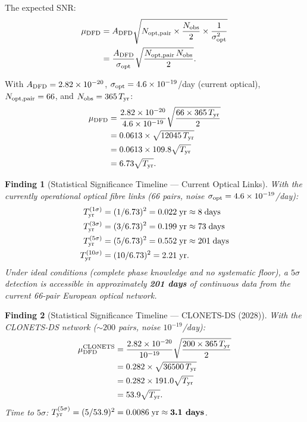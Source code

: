 \documentclass[aps,prd,twocolumn,superscriptaddress,nofootinbib]{revtex4-2}
\newtheorem{finding}{Finding}
\begin{document}
The expected SNR:
\begin{align}
\mu_{\rm DFD} &= A_{\rm DFD}\sqrt{N_{\rm opt,pair}
  \times \frac{N_{\rm obs}}{2} \times \frac{1}{\sigma_{\rm opt}^2}} \nonumber\\
&= \frac{A_{\rm DFD}}{\sigma_{\rm opt}}
  \sqrt{\frac{N_{\rm opt,pair}\,N_{\rm obs}}{2}}.
\label{eq:snr_general}
\end{align}

With $A_{\rm DFD} = 2.82\times10^{-20}$, $\sigma_{\rm opt} = 4.6\times10^{-19}$/day
(current optical), $N_{\rm opt,pair} = 66$, and $N_{\rm obs} = 365\,T_{\rm yr}$:
\begin{align}
\mu_{\rm DFD} &= \frac{2.82\times10^{-20}}{4.6\times10^{-19}}
  \sqrt{\frac{66\times365\,T_{\rm yr}}{2}} \nonumber\\
&= 0.0613\times\sqrt{12045\,T_{\rm yr}} \nonumber\\
&= 0.0613\times109.8\sqrt{T_{\rm yr}} \nonumber\\
&= 6.73\sqrt{T_{\rm yr}}.
\label{eq:snr_current}
\end{align}

\begin{finding}[Statistical Significance Timeline --- Current Optical Links]
\label{find:timeline_current}
With the currently operational optical fibre links (66 pairs, noise
$\sigma_{\rm opt} = 4.6\times10^{-19}$/day):
\begin{align}
T_{\rm yr}^{(1\sigma)} &= (1/6.73)^2 = 0.022\;\text{yr} \approx 8\;\text{days} \\
T_{\rm yr}^{(3\sigma)} &= (3/6.73)^2 = 0.199\;\text{yr} \approx 73\;\text{days} \\
T_{\rm yr}^{(5\sigma)} &= (5/6.73)^2 = 0.552\;\text{yr} \approx 201\;\text{days} \\
T_{\rm yr}^{(10\sigma)} &= (10/6.73)^2 = 2.21\;\text{yr}.
\end{align}
Under ideal conditions (complete phase knowledge and no systematic floor),
a $5\sigma$ detection is accessible in approximately \textbf{201 days} of
continuous data from the current 66-pair European optical network.
\end{finding}

\begin{finding}[Statistical Significance Timeline --- CLONETS-DS (2028)]
\label{find:timeline_clonets}
With the CLONETS-DS network ($\sim 200$ pairs, noise $10^{-19}$/day):
\begin{align}
\mu_{\rm DFD}^{\rm CLONETS} &= \frac{2.82\times10^{-20}}{10^{-19}}
  \sqrt{\frac{200\times365\,T_{\rm yr}}{2}} \nonumber\\
&= 0.282\times\sqrt{36500\,T_{\rm yr}} \nonumber\\
&= 0.282\times191.0\sqrt{T_{\rm yr}} \nonumber\\
&= 53.9\sqrt{T_{\rm yr}}.
\end{align}
Time to $5\sigma$: $T_{\rm yr}^{(5\sigma)} = (5/53.9)^2 = 0.0086\;\text{yr}
\approx \textbf{3.1~days}$.
\end{finding}
\end{document}
